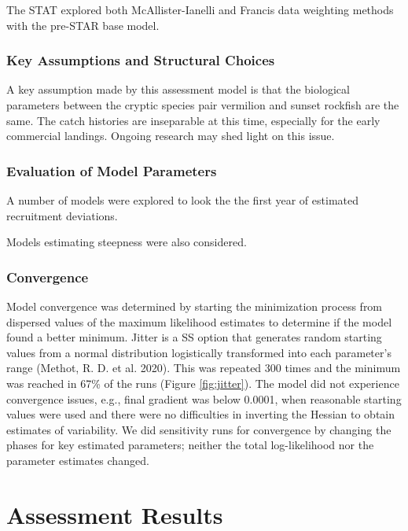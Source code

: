 \documentclass[
  english,
  a4paper,
]{article}
\begin{document}
The STAT explored both McAllister-Ianelli and Francis data weighting methods with the
pre-STAR base model.

\hypertarget{key-assumptions-and-structural-choices}{%
\subsubsection{Key Assumptions and Structural Choices}\label{key-assumptions-and-structural-choices}}

A key assumption made by this assessment model is that the biological parameters between the cryptic species pair vermilion and sunset rockfish are the same. The catch histories are inseparable at this time, especially for
the early commercial landings. Ongoing research may shed light on this issue.

\hypertarget{evaluation-of-model-parameters}{%
\subsubsection{Evaluation of Model Parameters}\label{evaluation-of-model-parameters}}

A number of models were explored to look the the first year of estimated recruitment deviations.

Models estimating steepness were also considered.

\hypertarget{convergence}{%
\subsubsection{Convergence}\label{convergence}}

Model convergence was determined by starting the minimization process from dispersed
values of the maximum likelihood estimates to determine if the model found a better
minimum. Jitter is a SS option that generates random starting values from a normal
distribution logistically transformed into each parameter's range (Methot, R. D. et al. 2020). This
was repeated 300 times and the minimum was reached in 67\% of the runs (Figure \ref{fig:jitter}).
The model did not experience convergence issues, e.g., final gradient was below 0.0001,
when reasonable starting values were used and there were no difficulties in inverting
the Hessian to obtain estimates of variability. We did sensitivity runs for
convergence by changing the phases for key estimated parameters; neither the total
log-likelihood nor the parameter estimates changed.

\hypertarget{assessment-results}{%
\section{Assessment Results}\label{assessment-results}}
\end{document}
